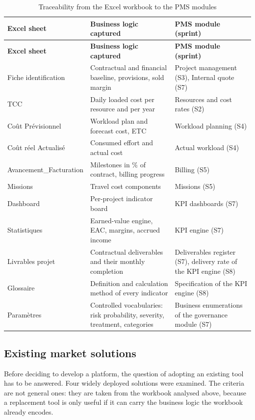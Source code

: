 \begin{longtable}{|m{4.3cm}|m{5.2cm}|m{4.6cm}|}
\caption{Traceability from the Excel workbook to the PMS modules}\label{tab:excel-traceability}\\
\hline
\textbf{Excel sheet} & \textbf{Business logic captured} & \textbf{PMS module (sprint)} \\
\hline
\endfirsthead
\hline
\textbf{Excel sheet} & \textbf{Business logic captured} & \textbf{PMS module (sprint)} \\
\hline
\endhead
\endfoot
\endlastfoot
\hline
Fiche identification & Contractual and financial baseline, provisions, sold margin & Project
management (S3), Internal quote (S7) \\
\hline
TCC & Daily loaded cost per resource and per year & Resources and cost rates (S2) \\
\hline
Co\^ut Pr\'evisionnel & Workload plan and forecast cost, ETC & Workload planning (S4) \\
\hline
Co\^ut r\'eel Actualis\'e & Consumed effort and actual cost & Actual workload (S4) \\
\hline
Avancement\_Facturation & Milestones in \% of contract, billing progress & Billing (S5) \\
\hline
Missions & Travel cost components & Missions (S5) \\
\hline
Dashboard & Per-project indicator board & KPI dashboards (S7) \\
\hline
Statistiques & Earned-value engine, EAC, margins, accrued income & KPI engine (S7) \\
\hline
Livrables projet & Contractual deliverables and their monthly completion & Deliverables register
(S7), delivery rate of the KPI engine (S8) \\
\hline
Glossaire & Definition and calculation method of every indicator & Specification of the KPI engine
(S8) \\
\hline
Param\`etres & Controlled vocabularies: risk probability, severity, treatment, categories &
Business enumerations of the governance module (S7) \\
\hline
\end{longtable}

\subsection{Existing market solutions}
Before deciding to develop a platform, the question of adopting an existing tool has to be
answered. Four widely deployed solutions were examined. The criteria are not general ones: they are
taken from the workbook analysed above, because a replacement tool is only useful if it can carry
the business logic the workbook already encodes.

